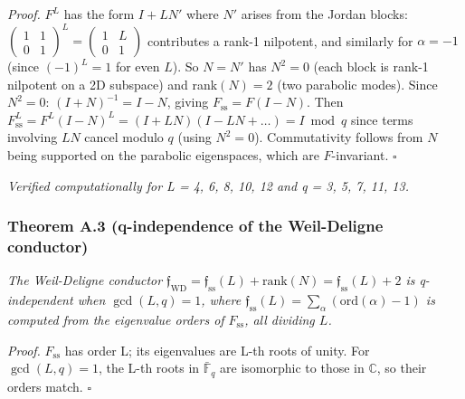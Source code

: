 \documentclass[
  11pt,
]{article}
\begin{document}
\emph{Proof.} \(F^L\) has the form \(I + LN'\) where \(N'\) arises from
the Jordan blocks:
\(\left(\begin{smallmatrix} 1 & 1 \\ 0 & 1 \end{smallmatrix}\right)^L = \left(\begin{smallmatrix} 1 & L \\ 0 & 1 \end{smallmatrix}\right)\)
contributes a rank-1 nilpotent, and similarly for \(\alpha = -1\) (since
\((-1)^L = 1\) for even \(L\)). So \(N = N'\) has \(N^2 = 0\) (each
block is rank-1 nilpotent on a 2D subspace) and rank\((N) = 2\) (two
parabolic modes). Since \(N^2 = 0\): \((I + N)^{-1} = I - N\), giving
\(F_{\mathrm{ss}} = F(I - N)\). Then
\(F_{\mathrm{ss}}^L = F^L(I - N)^L = (I + LN)(I - LN + \ldots) = I \bmod q\)
since terms involving \(LN\) cancel modulo \(q\) (using \(N^2 = 0\)).
Commutativity follows from \(N\) being supported on the parabolic
eigenspaces, which are \(F\)-invariant. \(\square\)

\emph{Verified computationally for L = 4, 6, 8, 10, 12 and q = 3, 5, 7,
11, 13.}

\hypertarget{theorem-a.3-q-independence-of-the-weil-deligne-conductor}{%
\subsubsection{Theorem A.3 (q-independence of the Weil-Deligne
conductor)}\label{theorem-a.3-q-independence-of-the-weil-deligne-conductor}}

\emph{The Weil-Deligne conductor
\(\mathfrak{f}_{\mathrm{WD}} = \mathfrak{f}_{\mathrm{ss}}(L) + \mathrm{rank}(N) = \mathfrak{f}_{\mathrm{ss}}(L) + 2\)
is q-independent when \(\gcd(L, q) = 1\), where
\(\mathfrak{f}_{\mathrm{ss}}(L) = \sum_\alpha (\mathrm{ord}(\alpha) - 1)\)
is computed from the eigenvalue orders of \(F_{\mathrm{ss}}\), all
dividing \(L\).}

\emph{Proof.} \(F_{\mathrm{ss}}\) has order L; its eigenvalues are L-th
roots of unity. For \(\gcd(L, q) = 1\), the L-th roots in
\(\bar{\mathbb{F}}_q\) are isomorphic to those in \(\mathbb{C}\), so
their orders match. \(\square\)
\end{document}
